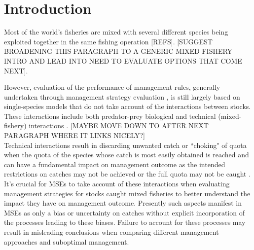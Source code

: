 \documentclass[12pt, halfline, a4paper]{ouparticle}
\begin{document}
\date{\today}


\maketitle

\section{Introduction}
\label{intro}

Most of the world's fisheries are mixed with several different species being
exploited together in the same fishing operation [REFS]. [SUGGEST BROADENING THIS PARAGRAPH TO A GENERIC MIXED FISHERY INTRO AND LEAD INTO NEED TO EVALUATE OPTIONS THAT COME NEXT].

However, evaluation of the
performance of management rules, generally undertaken through management
strategy evaluation \citep[MSE,][]{Punt2014}, is still largely based on
single-species models that do not take account of the interactions between
stocks. These interactions include both predator-prey biological
\citep{Thorpe2016} and technical (mixed-fishery) interactions
\citep{Ulrich2001}. [MAYBE MOVE DOWN TO AFTER NEXT PARAGRAPH WHERE IT LINKS NICELY?]\\

Technical interactions result in discarding unwanted catch or ``choking" of
quota when the quota of the species whose catch is most easily obtained is reached and can have a fundamental impact on management
outcome as the intended restrictions on catches may not be achieved or the full
quota may not be caught \citep[known in MSE frameworks as ``implementation
error",][]{Ulrich2011}. It's crucial for MSEs to take account of these
interactions when evaluating management strategies for stocks caught mixed
fisheries to better understand the impact they have on management outcome.
Presently such aspects manifest in MSEs as only a bias or uncertainty on
catches \citep{Dichmont2006} without explicit incorporation of the
processes leading to these biases. Failure to account for these processes
may result in misleading conclusions when comparing different management
approaches and suboptimal management. \\
\end{document}
